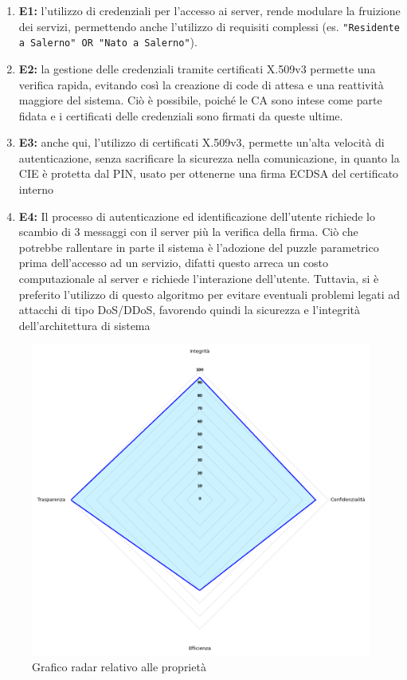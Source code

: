         \begin{enumerate}
            \item \textbf{E1:} l'utilizzo di credenziali per l'accesso ai server, rende modulare la fruizione dei servizi, permettendo anche l'utilizzo di requisiti complessi (es. \verb|"Residente a Salerno" OR "Nato a Salerno"|).

            \item \textbf{E2:} la gestione delle credenziali tramite certificati X.509v3 permette una verifica rapida, evitando così la creazione di code di attesa e una reattività maggiore del sistema.
            Ciò è possibile, poiché le CA sono intese come parte fidata e i certificati delle credenziali sono firmati da queste ultime.

            \item \textbf{E3:} anche qui, l'utilizzo di certificati X.509v3, permette un'alta velocità di autenticazione, senza sacrificare la sicurezza nella comunicazione, in quanto la CIE è protetta dal PIN, usato per ottenerne una firma ECDSA del certificato interno 

            \item \textbf{E4:} Il processo di autenticazione ed identificazione dell'utente richiede lo scambio di 3 messaggi con il server più la verifica della firma.
            Ciò che potrebbe rallentare in parte il sistema è l'adozione del puzzle parametrico prima dell'accesso ad un servizio, difatti questo arreca un costo computazionale al server e richiede l'interazione dell'utente.
            Tuttavia, si è preferito l'utilizzo di questo algoritmo per evitare eventuali problemi legati ad attacchi di tipo DoS/DDoS, favorendo quindi la sicurezza e l'integrità dell'architettura di sistema
        \end{enumerate}

    
    \begin{figure}[H]
        \centering
        \includegraphics[width=1 \textwidth]{radar.png}
        \caption{Grafico radar relativo alle proprietà}
        \label{radar-graph-properties}
    \end{figure}